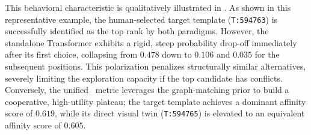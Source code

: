 This behavioral characteristic is qualitatively illustrated in . As shown in this representative example, the human-selected target template (\texttt{T:594763}) is successfully identified as the top rank by both paradigms. However, the standalone Transformer exhibits a rigid, steep probability drop-off immediately after its first choice, collapsing from $0.478$ down to $0.106$ and $0.035$ for the subsequent positions. This polarization penalizes structurally similar alternatives, severely limiting the exploration capacity if the top candidate has conflicts.
Conversely, the unified \neuralmethod\ metric leverages the graph-matching prior to build a cooperative, high-utility plateau; the target template achieves a dominant affinity score of $0.619$, while its direct visual twin (\texttt{T:594765}) is elevated to an equivalent affinity score of $0.605$.

